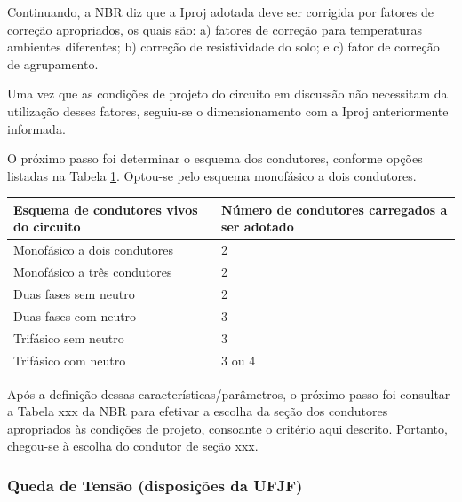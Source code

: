 Continuando, a NBR diz que a Iproj adotada deve ser corrigida por fatores de correção apropriados, os quais são: a) fatores de correção para temperaturas ambientes diferentes; b) correção de resistividade do solo; e c) fator de correção de agrupamento.

Uma vez que as condições de projeto do circuito em discussão não necessitam da utilização desses fatores, seguiu-se o dimensionamento com a Iproj anteriormente informada.

	O próximo passo foi determinar o esquema dos condutores, conforme opções listadas na Tabela \ref{metodo-definicao}. Optou-se pelo esquema monofásico a dois condutores.
	
\begin{table}[h]
\begin{tabular}{| l | l |}
\hline
Esquema de condutores vivos do circuito & Número de condutores carregados a ser adotado \\ \hline
Monofásico a dois condutores            & 2                                             \\ \hline
Monofásico a três condutores            & 2                                             \\ \hline
Duas fases sem neutro                   & 2                                             \\ \hline
Duas fases com neutro                   & 3                                             \\ \hline
Trifásico sem neutro                    & 3                                             \\ \hline
Trifásico com neutro                    & 3 ou 4
\\ \hline
\end{tabular}
\label{metodo-definicao}
\end{table}

Após a definição dessas características/parâmetros, o próximo passo foi consultar a Tabela xxx da NBR para efetivar a escolha da seção dos condutores apropriados às condições de projeto, consoante o critério aqui descrito. Portanto, chegou-se à escolha do condutor de seção xxx.

\subsubsection{Queda de Tensão (disposições da UFJF)}

